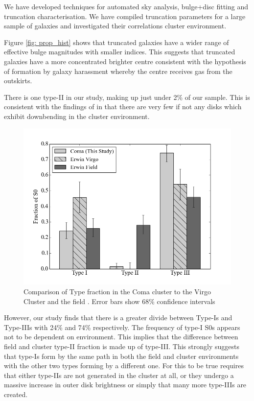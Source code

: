 
We have developed techniques for automated sky analysis, bulge+disc fitting and truncation characterisation. We have compiled truncation parameters for a large sample of galaxies and investigated their correlations cluster environment. 

Figure \ref{fig: prop_hist} shows that truncated galaxies have a wider range of effective bulge magnitudes with smaller \sersic indices. This suggests that truncated galaxies have a more concentrated brighter centre consistent with the hypothesis of formation by galaxy harassment whereby the centre receives gas from the outskirts.

There is one type-II in our study, making up just under 2\% of our sample. This is consistent with the findings of \citet{erwin_strong_2012} in that there are very few if not any disks which exhibit downbending in the cluster environment. 
\begin{figure}
	\centering
	\includegraphics[width=\textwidth, scale=0.6]{figs/total_bar_chart_truncs_incl_field.png}
	\caption{Comparison of Type fraction in the Coma cluster to the Virgo Cluster and the field \citep{erwin_strong_2012}. Error bars show 68\% confidence intervals \citep{wilson_probable_1927}}
\end{figure}
However, our study finds that there is a greater divide between Type-Is and Type-IIIs with 24\% and 74\% respectively. The frequency of type-I S0s appears not to be dependent on environment. This implies that the difference between field and cluster type-II fraction is made up of type-III. This strongly suggests that type-Is form by the same path in both the field and cluster environments with the other two types forming by a different one. For this to be true requires that either type-IIs are not generated in the cluster at all, or they undergo a massive increase in outer disk brightness or simply that many more type-IIIs are created. 

